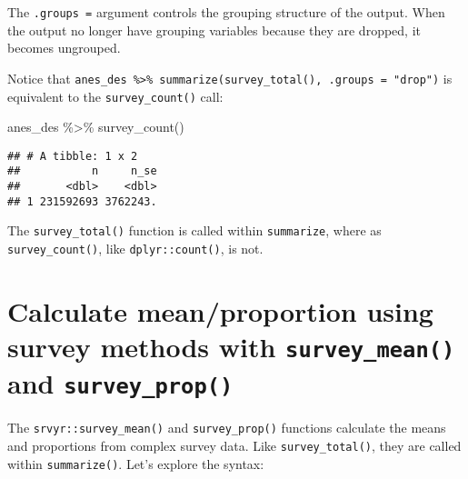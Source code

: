 \documentclass[
]{krantz}
\makeatletter
\newenvironment{Shaded}{\begin{snugshade}}{\end{snugshade}}
\newcommand{\FunctionTok}[1]{\textcolor[rgb]{0,0,0}{#1}}
\newcommand{\NormalTok}[1]{#1}
\newcommand{\SpecialCharTok}[1]{\textcolor[rgb]{0,0,0}{#1}}
\newenvironment{kframe}{%
\medskip{}
\setlength{\fboxsep}{.8em}
 \def\at@end@of@kframe{}%
 \ifinner\ifhmode%
  \def\at@end@of@kframe{\end{minipage}}%
  \begin{minipage}{\columnwidth}%
 \fi\fi%
 \def\FrameCommand##1{\hskip\@totalleftmargin \hskip-\fboxsep
 \colorbox{shadecolor}{##1}\hskip-\fboxsep
     \hskip-\linewidth \hskip-\@totalleftmargin \hskip\columnwidth}%
 \MakeFramed {\advance\hsize-\width
   \@totalleftmargin\z@ \linewidth\hsize
   \@setminipage}}%
 {\par\unskip\endMakeFramed%
 \at@end@of@kframe}
\renewenvironment{Shaded}{\begin{kframe}}{\end{kframe}}
\makeatother
\begin{document}
The \texttt{.groups\ =} argument controls the grouping structure of the output. When the output no longer have grouping variables because they are dropped, it becomes ungrouped.

Notice that \texttt{anes\_des\ \%\textgreater{}\%\ summarize(survey\_total(),\ .groups\ =\ "drop")} is equivalent to the \texttt{survey\_count()} call:

\begin{Shaded}
\begin{Highlighting}[]
\NormalTok{anes\_des }\SpecialCharTok{\%\textgreater{}\%}
  \FunctionTok{survey\_count}\NormalTok{() }
\end{Highlighting}
\end{Shaded}

\begin{verbatim}
## # A tibble: 1 x 2
##           n     n_se
##       <dbl>    <dbl>
## 1 231592693 3762243.
\end{verbatim}

The \texttt{survey\_total()} function is called within \texttt{summarize}, where as \texttt{survey\_count()}, like \texttt{dplyr::count()}, is not.

\hypertarget{calculate-meanproportion-using-survey-methods-with-survey_mean-and-survey_prop}{%
\section{\texorpdfstring{Calculate mean/proportion using survey methods with \texttt{survey\_mean()} and \texttt{survey\_prop()}}{Calculate mean/proportion using survey methods with survey\_mean() and survey\_prop()}}\label{calculate-meanproportion-using-survey-methods-with-survey_mean-and-survey_prop}}

The \texttt{srvyr::survey\_mean()} and \texttt{survey\_prop()} functions calculate the means and proportions from complex survey data. Like \texttt{survey\_total()}, they are called within \texttt{summarize()}. Let's explore the syntax:
\end{document}
